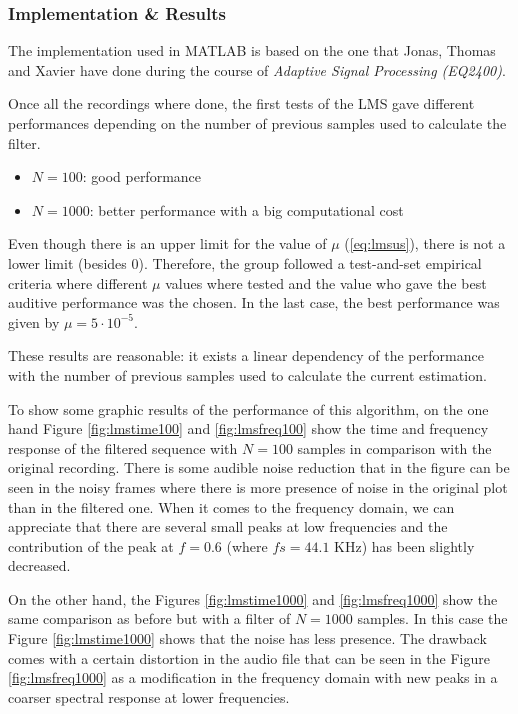 \documentclass[11pt,a4paper,english]{book}  %
\theoremstyle{definition}  %
\theoremstyle{plain}  %
\theoremstyle{remark}  %
\begin{document}
	
	\subsubsection{Implementation \& Results}
	
	The implementation used in MATLAB is based on the one that Jonas, Thomas and Xavier have done during the course of \textit{Adaptive Signal Processing (EQ2400)}.
	
	Once all the recordings where done, the first tests of the LMS gave different performances depending on the number of previous samples used to calculate the filter.
	
	\begin{itemize}
	\item $N=100$: good performance
	\item $N=1000$: better performance with a big computational cost
	\end{itemize}
	
	Even though there is an upper limit for the value of $\mu$ (\ref{eq:lmsus}), there is not a lower limit (besides $0$). Therefore, the group followed a test-and-set empirical criteria where different $\mu$ values where tested and the value who gave the best auditive performance was the chosen. In the last case, the best performance was given by $\mu=5 \cdot 10^{-5}.$
	
	These results are reasonable: it exists a linear dependency of the performance with the number of previous samples used to calculate the current estimation.
	
	To show some graphic results of the performance of this algorithm, on the one hand Figure \ref{fig:lmstime100} and \ref{fig:lmsfreq100} show the time and frequency response of the filtered sequence with $N=100$ samples in comparison with the original recording. There is some audible noise reduction that in the figure can be seen in the noisy frames where there is more presence of noise in the original plot than in the filtered one. When it comes to the frequency domain, we can appreciate that there are several small peaks at low frequencies and the contribution of the peak at $f=0.6$ (where $fs=44.1$ KHz) has been slightly decreased.
	
	On the other hand,  the Figures \ref{fig:lmstime1000} and \ref{fig:lmsfreq1000} show the same comparison as before but with a filter of $N=1000$ samples. In this case the Figure \ref{fig:lmstime1000} shows that the noise has less presence. The drawback comes with a certain distortion in the audio file that can be seen in the Figure \ref{fig:lmsfreq1000} as a modification in the frequency domain with new peaks in a coarser spectral response at lower frequencies.
	
\end{document}

